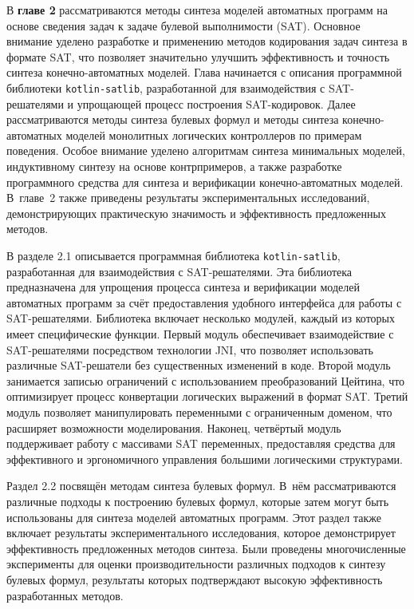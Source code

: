 В \textbf{главе 2} рассматриваются методы синтеза моделей автоматных программ на основе сведения задач к задаче булевой выполнимости (SAT).
Основное внимание уделено разработке и применению методов кодирования задач синтеза в формате SAT, что позволяет значительно улучшить эффективность и точность синтеза конечно-автоматных моделей.
Глава начинается с описания программной библиотеки \texttt{kotlin-satlib}, разработанной для взаимодействия с SAT-решателями и упрощающей процесс построения SAT-кодировок.
Далее рассматриваются методы синтеза булевых формул и методы синтеза конечно-автоматных моделей монолитных логических контроллеров по примерам поведения.
Особое внимание уделено алгоритмам синтеза минимальных моделей, индуктивному синтезу на основе контрпримеров, а также разработке программного средства  для синтеза и верификации конечно-автоматных моделей.
В~главе~2 также приведены результаты экспериментальных исследований, демонстрирующих практическую значимость и эффективность предложенных методов.

В разделе 2.1 описывается программная библиотека \texttt{kotlin-satlib}, разработанная для взаимодействия с SAT-решателями.
Эта библиотека предназначена для упрощения процесса синтеза и верификации моделей автоматных программ за счёт предоставления удобного интерфейса для работы с SAT-решателями.
Библиотека включает несколько модулей, каждый из которых имеет специфические функции.
Первый модуль обеспечивает взаимодействие с SAT-решателями посредством технологии JNI, что позволяет использовать различные SAT-решатели без существенных изменений в коде.
Второй модуль занимается записью ограничений с использованием преобразований Цейтина, что оптимизирует процесс конвертации логических выражений в формат SAT.
Третий модуль позволяет манипулировать переменными с ограниченным доменом, что расширяет возможности моделирования.
Наконец, четвёртый модуль поддерживает работу с массивами SAT переменных, предоставляя средства для эффективного и эргономичного управления большими логическими структурами.

Раздел 2.2 посвящён методам синтеза булевых формул.
В~нём рассматриваются различные подходы к построению булевых формул, которые затем могут быть использованы для синтеза моделей автоматных программ.
Этот раздел также включает результаты экспериментального исследования, которое демонстрирует эффективность предложенных методов синтеза.
Были проведены многочисленные эксперименты для оценки производительности различных подходов к синтезу булевых формул, результаты которых подтверждают высокую эффективность разработанных методов.

